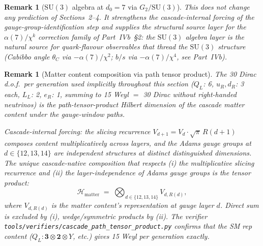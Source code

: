 \documentclass[12pt,a4paper]{article}
\newtheorem{remark}[theorem]{Remark}
\begin{document}
\begin{remark}[$\mathrm{SU}(3)$ algebra at $d_0=7$ via $G_2/\mathrm{SU}(3)$]
This does not change any prediction of Sections~2--4. It
strengthens the cascade-internal forcing of the
gauge-group-identification step and supplies the structural source
layer for the $\alpha(7)/\chi^k$ correction family of Part~IVb~\S2:
the $\mathrm{SU}(3)$ algebra layer is the natural source for
quark-flavour observables that thread the $\mathrm{SU}(3)$ structure
(Cabibbo angle $\theta_C$ via $-\alpha(7)/\chi^2$; $b/s$ via
$-\alpha(7)/\chi^4$, see Part~IVb).
\end{remark}

\begin{remark}[Matter content composition via path tensor product]\label{rem:path-tensor}
The 30 Dirac d.o.f.\ per generation used implicitly throughout this
section ($Q_L$: 6, $u_R, d_R$: 3 each, $L_L$: 2, $e_R$: 1, summing
to 15 Weyl $=$ 30 Dirac without right-handed neutrinos) is the
path-tensor-product Hilbert dimension of the cascade matter content
under the gauge-window paths.

Cascade-internal forcing: the slicing recurrence $V_{d+1}=V_d
\cdot\sqrt{\pi}\,R(d+1)$ composes content multiplicatively across
layers, and the Adams gauge groups at $d\in\{12,13,14\}$ are
independent structures at distinct distinguished dimensions. The
unique cascade-native composition that respects (i) the
multiplicative slicing recurrence and (ii) the layer-independence
of Adams gauge groups is the tensor product:
\[
\mathcal{H}_{\text{matter}}\;=\;\bigotimes_{d\in\{12,13,14\}}V_{d,R(d)},
\]
where $V_{d,R(d)}$ is the matter content's representation at gauge
layer $d$. Direct sum is excluded by (i), wedge/symmetric products
by (ii). The verifier
\texttt{tools/verifiers/\allowbreak cascade\_path\_\allowbreak tensor\_\allowbreak product.py}
confirms that the SM rep content
($Q_L: \mathbf{3}\otimes\mathbf{2}\otimes Y$, etc.) gives 15 Weyl
per generation exactly.
\end{remark}
\end{document}
